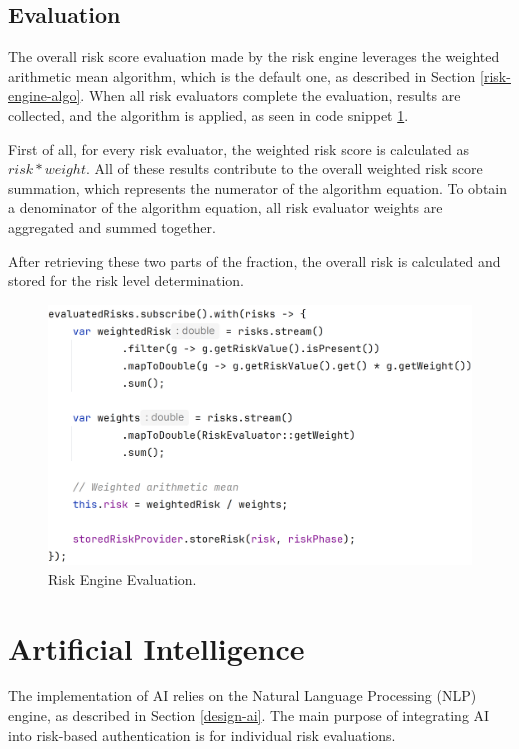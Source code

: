 \subsection{Evaluation} \label{impl-engine-evaluation}
The overall risk score evaluation made by the risk engine leverages the weighted arithmetic mean algorithm, which is the default one, as described in Section \ref{risk-engine-algo}.
When all risk evaluators complete the evaluation, results are collected, and the algorithm is applied, as seen in code snippet \ref{fig:impl-risk-engine-evaluation}.

First of all, for every risk evaluator, the weighted risk score is calculated as \( risk * weight \).
All of these results contribute to the overall weighted risk score summation, which represents the numerator of the algorithm equation.
To obtain a denominator of the algorithm equation, all risk evaluator weights are aggregated and summed together.

After retrieving these two parts of the fraction, the overall risk is calculated and stored for the risk level determination. 

\begin{figure}[htbp]
  \centering
  \includegraphics[width=1\textwidth]{img/sections/6-implementation/risk-engine-evaluation.png}
  \caption{Risk Engine Evaluation.}
  \label{fig:impl-risk-engine-evaluation}
\end{figure}

\newpage
\section{Artificial Intelligence}
The implementation of AI relies on the Natural Language Processing (NLP) engine, as described in Section \ref{design-ai}.
The main purpose of integrating AI into risk-based authentication is for individual risk evaluations.

